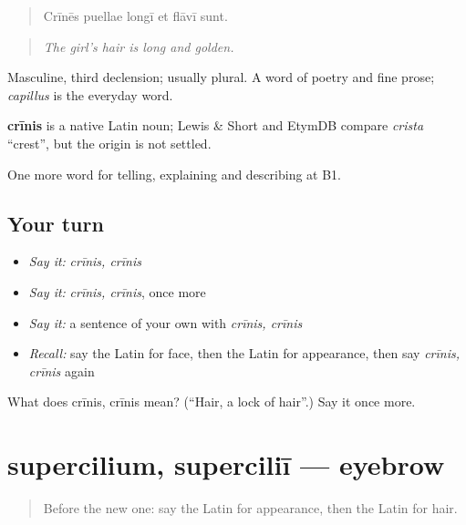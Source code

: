 \begin{quote}
Crīnēs puellae longī et flāvī sunt.
\end{quote}

\begin{quote}
\emph{The girl's hair is long and golden.}
\end{quote}

Masculine, third declension; usually plural. A word of poetry and fine prose; \emph{capillus} is the everyday word.

\begin{cousinweb}
\textbf{crīnis} is a native Latin noun; Lewis \& Short and EtymDB compare \emph{crista} \textquotedblleft{}crest\textquotedblright{}, but the origin is not settled.
\end{cousinweb}

\begin{grammarlens}[title={What you've built}]
One more word for telling, explaining and describing at B1.
\end{grammarlens}

\subsection*{Your turn}
\begin{itemize}
\raggedright
  \item \emph{Say it:} \emph{crīnis, crīnis}
  \item \emph{Say it:} \emph{crīnis, crīnis}, once more
  \item \emph{Say it:} a sentence of your own with \emph{crīnis, crīnis}
  \item \emph{Recall:} say the Latin for face, then the Latin for appearance, then say \emph{crīnis, crīnis} again
\end{itemize}

\begin{tcolorbox}[breakable,colback=teal!4,colframe=teal!35!black,title={Before you move on}]
What does crīnis, crīnis mean? (\textquotedblleft{}Hair, a lock of hair\textquotedblright{}.) Say it once more.
\end{tcolorbox}
\section[supercilium, superciliī]{supercilium, superciliī — eyebrow}

\label{lesson:LA-C515-supercilium}



\begin{quote}
Before the new one: say the Latin for appearance, then the Latin for hair.
\end{quote}

